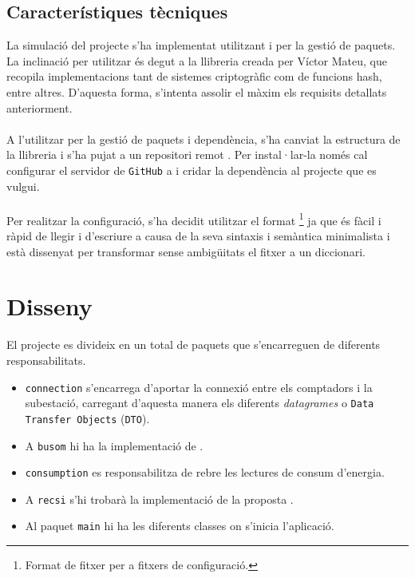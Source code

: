 \subsection{Característiques tècniques}
La simulació del projecte s'ha implementat utilitzant \texttt{\java} i \texttt{\mavenLarge} per la gestió de paquets. La inclinació per utilitzar \texttt{\java} és degut a la llibreria \ciglib creada per Víctor Mateu, que recopila implementacions tant de sistemes criptogràfic com de funcions hash, entre altres. D'aquesta forma, s'intenta assolir el màxim els requisits detallats anteriorment.
\\
\\
A l'utilitzar \maven per la gestió de paquets i dependència, s'ha canviat la estructura de la llibreria i s'ha pujat a un repositori remot \cite{ciglib}. Per instal·lar-la només cal configurar el servidor de \texttt{GitHub} a \maven i cridar la dependència al projecte que es vulgui.
\\
\\
Per realitzar la configuració, s'ha decidit utilitzar el format \toml\footnote{Format de fitxer per a fitxers de configuració.} ja que és fàcil i ràpid de llegir i d'escriure a causa de la seva sintaxis i semàntica minimalista i està dissenyat per transformar sense ambigüitats el fitxer a un diccionari.
\section{Disseny}
El projecte es divideix en un total de  paquets que s'encarreguen de diferents responsabilitats.
\begin{itemize}
	\item \texttt{connection} s'encarrega d'aportar la connexió entre els comptadors i la subestació, carregant d'aquesta manera els diferents \textit{datagrames} o  \texttt{Data Transfer Objects} (\texttt{DTO}).
	\item A \texttt{busom} hi ha la implementació de \cite{busom}.
	\item \texttt{consumption} es responsabilitza de rebre les lectures de consum d'energia.
	\item A \texttt{recsi} s'hi trobarà la implementació de la proposta \cite{recsi}.
	\item Al paquet \texttt{main} hi ha les diferents classes on s'inicia l'aplicació. \label{list:packages}
\end{itemize}

